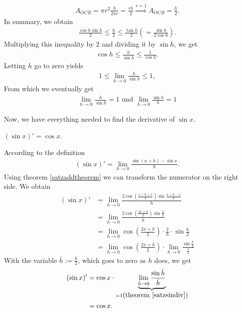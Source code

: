 \documentclass[12pt,eng]{skript_ogg}
\begin{document}
\begin{beweis}
\begin{align*}
A_{OCB}=\pi r^2\frac{h}{2\pi r}=\frac{rh}{2} \stackrel{r=1}{\Longrightarrow} A_{OCB}=\frac{h}{2}.
\end{align*}
In summary, we obtain
\begin{align*}
\frac{\cos h\sin h}{2}\leq\frac{h}{2}\leq\frac{\tan h}{2} \left(
  =\frac{\sin h}{2\cos h}\right).
\end{align*}
Multiplying this inequality by $2$ and dividing it by
$\sin h$, we get
\begin{align*}
\cos h\leq \frac{h}{\sin h}\leq \frac{1}{\cos h}.
\end{align*}
Letting $h$ go to zero yields
\begin{align*}
1\leq\lim_{h\rightarrow 0}\frac{h}{\sin h}\leq 1,
\end{align*}
From which we eventually get
\begin{align*}
\lim_{h\rightarrow 0}\frac{h}{\sin h}=1 \mbox{ und }
\lim_{h\rightarrow 0}\frac{\sin h}{h}=1
\end{align*}
\end{beweis}
Now, we have everything needed to find the derivative of $\sin x$.
\begin{satz}
$(\sin x)'=\cos x$.
\end{satz}
\begin{beweis}
According to the definition
\begin{align*}
(\sin x)'=\lim_{h\rightarrow 0}\frac{\sin (x+h)-\sin x}{h}.
\end{align*}
Using theorem \ref{satzaddtheorem} we can transform the numerator on the right side. We obtain
\begin{align*}
(\sin x)'&=\lim_{h\rightarrow 0}\frac{2\cos
  \left(\frac{x +h+x}{2}\right)\sin \frac{x+h-x}{2}}{h} \\
&=\lim_{h\rightarrow 0}\frac{2\cos
  \left(\frac{2x +h}{2}\right)\sin \frac{h}{2}}{h} \\
&=\lim_{h\rightarrow 0}\cos
  \left(\frac{2x +h}{2}\right)\cdot\frac{2}{h}\cdot\sin \frac{h}{2} \\  
&=\lim_{h\rightarrow 0}\cos
  \left(\frac{2x +h}{2}\right)\cdot \lim_{h\rightarrow 0}\frac{\sin \frac{h}{2}}{\frac{h}{2}}
\end{align*}
With the variable $\bar{h}:=\frac{h}{2}$, which goes to zero as $h$ does, we get
\begin{align*}
(\sin x)'&=\cos x \cdot \underbrace{\lim_{\bar{h}\rightarrow
    0}\frac{\sin \bar{h}}{\bar{h}}}_{=1 \mbox{(theorem
    \ref{satzsindiv})}} \\
&=\cos x .
\end{align*}
\end{beweis}
\end{document}
